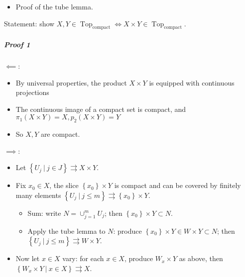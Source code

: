 \begin{solution}

\hfill

\begin{concept}

\hfill

\begin{itemize}
\tightlist
\item
  Proof of the tube lemma.
\end{itemize}

\end{concept}

Statement: show
\(X, Y \in {\operatorname{Top}}_{\mathrm{compact}} \iff X\times Y\in {\operatorname{Top}}_{\mathrm{compact}}\).

\hypertarget{proof-1}{%
\subparagraph{Proof 1}\label{proof-1}}

\(\impliedby\):

\begin{itemize}
\tightlist
\item
  By universal properties, the product \(X\times Y\) is equipped with
  continuous projections
\item
  The continuous image of a compact set is compact, and
  \(\pi_1(X\times Y) = X, p_2(X\times Y) = Y\)
\item
  So \(X, Y\) are compact.
\end{itemize}

\(\implies\):

\begin{itemize}
\tightlist
\item
  Let
  \(\left\{{U_j {~\mathrel{\Big|}~}j\in J}\right\} \rightrightarrows X\times Y\).
\item
  Fix \(x_0\in X\), the slice \(\left\{{x_0}\right\} \times Y\) is
  compact and can be covered by finitely many elements
  \(\left\{{U_j{~\mathrel{\Big|}~}j\leq m}\right\} \rightrightarrows\left\{{x_0}\right\} \times Y\).

  \begin{itemize}
  \tightlist
  \item
    Sum: write \(N = \cup_{j=1}^m U_j\); then
    \(\left\{{x_0}\right\} \times Y \subset N\).
  \item
    Apply the tube lemma to \(N\): produce
    \(\left\{{x_0}\right\} \times Y \in W\times Y \subset N\); then
    \(\left\{{U_j {~\mathrel{\Big|}~}j\leq m}\right\}\rightrightarrows W\times Y\).
  \end{itemize}
\item
  Now let \(x\in X\) vary: for each \(x\in X\), produce \(W_x \times Y\)
  as above, then
  \(\left\{{W_x\times Y{~\mathrel{\Big|}~}x\in X}\right\}\rightrightarrows X\).


\end{itemize}
\end{solution}
